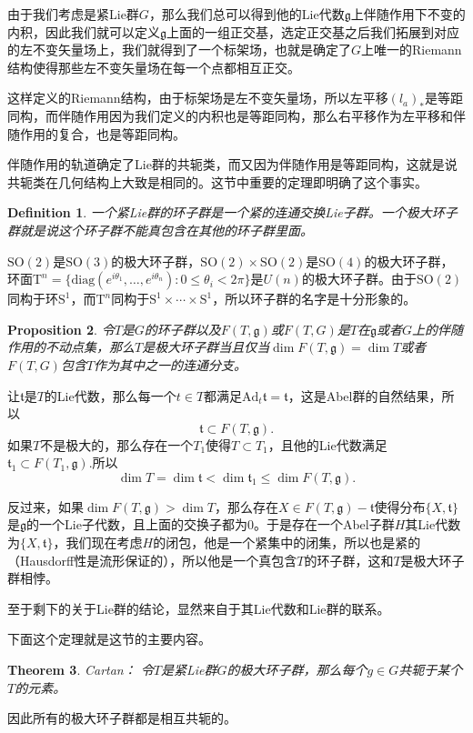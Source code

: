 \documentclass[9pt]{extbook}
\theoremstyle{plain}
\newtheorem{defi}{Definition}
\newtheorem{pro}[defi]{Proposition}
\newtheorem{theo}[defi]{Theorem}
\newcommand{\lag}{{\mathfrak{g}}}  %
\begin{document}
由于我们考虑是紧Lie群$G$，那么我们总可以得到他的Lie代数$\lag$上伴随作用下不变的内积，因此我们就可以定义$\lag$上面的一组正交基，选定正交基之后我们拓展到对应的左不变矢量场上，我们就得到了一个标架场，也就是确定了$G$上唯一的Riemann结构使得那些左不变矢量场在每一个点都相互正交。

这样定义的Riemann结构，由于标架场是左不变矢量场，所以左平移$(l_a)_*$是等距同构，而伴随作用因为我们定义的内积也是等距同构，那么右平移作为左平移和伴随作用的复合，也是等距同构。

伴随作用的轨道确定了Lie群的共轭类，而又因为伴随作用是等距同构，这就是说共轭类在几何结构上大致是相同的。这节中重要的定理即明确了这个事实。
\begin{defi}
一个紧Lie群的环子群是一个紧的连通交换Lie子群。一个极大环子群就是说这个环子群不能真包含在其他的环子群里面。
\end{defi}

$\mathrm{SO}(2)$是$\mathrm{SO}(3)$的极大环子群，$\mathrm{SO}(2)\times \mathrm{SO}(2)$是$\mathrm{SO}(4)$的极大环子群，环面$\mathrm{T}^n=\{\mathrm{diag}(e^{i\theta_1},\dots,e^{i\theta_n}):0\leq\theta_i<2\pi\}$是$U(n)$的极大环子群。由于$\mathrm{SO}(2)$同构于环$\mathrm{S}^1$，而$\mathrm{T}^n$同构于$\mathrm{S}^1\times\cdots\times\mathrm{S}^1$，所以环子群的名字是十分形象的。

\begin{pro}
令$T$是$G$的环子群以及$F(T,\lag)$或$F(T,G)$是$T$在$\lag$或者$G$上的伴随作用的不动点集，那么$T$是极大环子群当且仅当$\dim F(T,\lag)=\dim T$或者$F(T,G)$包含$T$作为其中之一的连通分支。
\end{pro}
让$\mathfrak{t}$是$T$的Lie代数，那么每一个$t\in T$都满足$\mathrm{Ad}_t\mathfrak{t}=\mathfrak{t}$，这是Abel群的自然结果，所以
\[
	\mathfrak{t}\subset F(T,\lag).
\]
如果$T$不是极大的，那么存在一个$T_1$使得$T\subset T_1$，且他的Lie代数满足$\mathfrak{t}_1\subset F(T_1,\lag)$.所以
\[
	\dim T=\dim \mathfrak{t}<\dim \mathfrak{t}_1\leq \dim F(T,\lag).
\]

反过来，如果$\dim  F(T,\lag)>\dim T$，那么存在$X\in F(T,\lag)-\mathfrak{t}$使得分布$\{X,\mathfrak{t}\}$是$\lag$的一个Lie子代数，且上面的交换子都为$0$。于是存在一个Abel子群$H$其Lie代数为$\{X,\mathfrak{t}\}$，我们现在考虑$H$的闭包，他是一个紧集中的闭集，所以也是紧的（Hausdorff性是流形保证的），所以他是一个真包含$T$的环子群，这和$T$是极大环子群相悖。

至于剩下的关于Lie群的结论，显然来自于其Lie代数和Lie群的联系。

下面这个定理就是这节的主要内容。
\begin{theo}Cartan：
令$T$是紧Lie群$G$的极大环子群，那么每个$g\in G$共轭于某个$T$的元素。
\end{theo}
因此所有的极大环子群都是相互共轭的。
\end{document}
